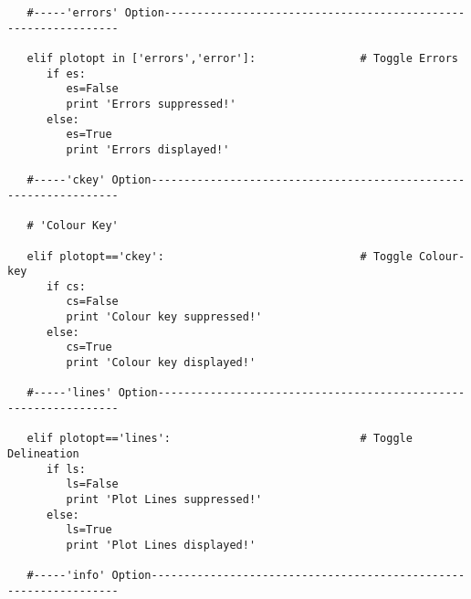 \begin{verbatim}
   #-----'errors' Option---------------------------------------------------------------

   elif plotopt in ['errors','error']:                # Toggle Errors
      if es:
         es=False
         print 'Errors suppressed!'
      else:
         es=True
         print 'Errors displayed!'

   #-----'ckey' Option-----------------------------------------------------------------

   # 'Colour Key'

   elif plotopt=='ckey':                              # Toggle Colour-key
      if cs:
         cs=False
         print 'Colour key suppressed!'
      else:
         cs=True
         print 'Colour key displayed!'

   #-----'lines' Option----------------------------------------------------------------

   elif plotopt=='lines':                             # Toggle Delineation
      if ls:
         ls=False
         print 'Plot Lines suppressed!'
      else:
         ls=True
         print 'Plot Lines displayed!'

   #-----'info' Option-----------------------------------------------------------------


\end{verbatim}

